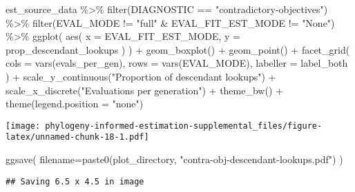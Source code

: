 \documentclass[
]{book}
\newenvironment{Shaded}{\begin{snugshade}}{\end{snugshade}}
\newcommand{\AttributeTok}[1]{\textcolor[rgb]{0.77,0.63,0.00}{#1}}
\newcommand{\FunctionTok}[1]{\textcolor[rgb]{0.00,0.00,0.00}{#1}}
\newcommand{\NormalTok}[1]{#1}
\newcommand{\SpecialCharTok}[1]{\textcolor[rgb]{0.00,0.00,0.00}{#1}}
\newcommand{\StringTok}[1]{\textcolor[rgb]{0.31,0.60,0.02}{#1}}
\begin{document}
\begin{Shaded}
\begin{Highlighting}[]
\NormalTok{est\_source\_data }\SpecialCharTok{\%\textgreater{}\%}
  \FunctionTok{filter}\NormalTok{(DIAGNOSTIC }\SpecialCharTok{==} \StringTok{"contradictory{-}objectives"}\NormalTok{) }\SpecialCharTok{\%\textgreater{}\%}
  \FunctionTok{filter}\NormalTok{(EVAL\_MODE }\SpecialCharTok{!=} \StringTok{"full"} \SpecialCharTok{\&}\NormalTok{ EVAL\_FIT\_EST\_MODE }\SpecialCharTok{!=} \StringTok{"None"}\NormalTok{) }\SpecialCharTok{\%\textgreater{}\%}
  \FunctionTok{ggplot}\NormalTok{(}
      \FunctionTok{aes}\NormalTok{(}
        \AttributeTok{x =}\NormalTok{ EVAL\_FIT\_EST\_MODE,}
        \AttributeTok{y =}\NormalTok{ prop\_descendant\_lookups}
\NormalTok{      )}
\NormalTok{    ) }\SpecialCharTok{+}
    \FunctionTok{geom\_boxplot}\NormalTok{() }\SpecialCharTok{+}
    \FunctionTok{geom\_point}\NormalTok{() }\SpecialCharTok{+}
    \FunctionTok{facet\_grid}\NormalTok{(}
      \AttributeTok{cols =} \FunctionTok{vars}\NormalTok{(evals\_per\_gen),}
      \AttributeTok{rows =} \FunctionTok{vars}\NormalTok{(EVAL\_MODE),}
      \AttributeTok{labeller =}\NormalTok{ label\_both}
\NormalTok{    ) }\SpecialCharTok{+}
    \FunctionTok{scale\_y\_continuous}\NormalTok{(}\StringTok{"Proportion of descendant lookups"}\NormalTok{) }\SpecialCharTok{+}
    \FunctionTok{scale\_x\_discrete}\NormalTok{(}\StringTok{"Evaluations per generation"}\NormalTok{) }\SpecialCharTok{+}
    \FunctionTok{theme\_bw}\NormalTok{() }\SpecialCharTok{+}
    \FunctionTok{theme}\NormalTok{(}\AttributeTok{legend.position =} \StringTok{"none"}\NormalTok{)}
\end{Highlighting}
\end{Shaded}

\texttt{[image: phylogeny-informed-estimation-supplemental\_files/figure-latex/unnamed-chunk-18-1.pdf]}

\begin{Shaded}
\begin{Highlighting}[]
\FunctionTok{ggsave}\NormalTok{(}
   \AttributeTok{filename=}\FunctionTok{paste0}\NormalTok{(plot\_directory, }\StringTok{"contra{-}obj{-}descendant{-}lookups.pdf"}\NormalTok{)}
\NormalTok{)}
\end{Highlighting}
\end{Shaded}

\begin{verbatim}
## Saving 6.5 x 4.5 in image
\end{verbatim}
\end{document}
